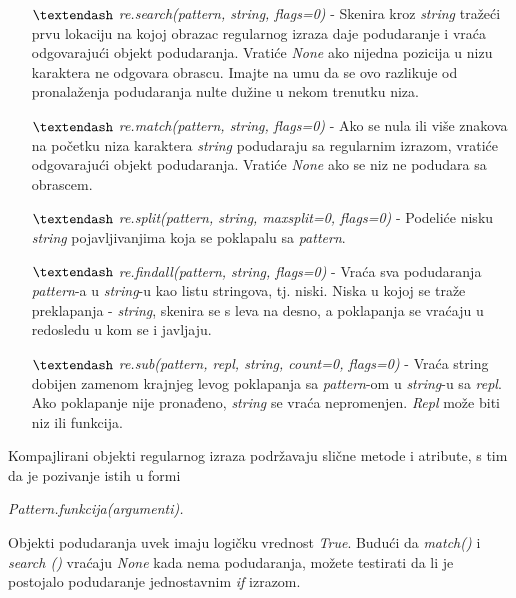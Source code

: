 \documentclass[12pt,oneside]{memoir}
\theoremstyle{plain}
\theoremstyle{definition}
\begin{document}
\begin{itemize}
\item[$\textendash$]  \textit{re.search(pattern, string, flags=0)} - Skenira kroz \textit{string} tražeći prvu lokaciju na kojoj obrazac regularnog izraza daje podudaranje i vraća odgovarajući objekt podudaranja. Vratiće \textit{None} ako nijedna pozicija u nizu karaktera ne odgovara obrascu. Imajte na umu da se ovo razlikuje od pronalaženja podudaranja nulte dužine u nekom trenutku niza.
\item[$\textendash$]  \textit{re.match(pattern, string, flags=0)} - Ako se nula ili više znakova na početku niza karaktera \textit{string}  podudaraju sa regularnim izrazom, vratiće odgovarajući objekt podudaranja. Vratiće \textit{None} ako se niz ne podudara sa obrascem.
\item[$\textendash$]  \textit{re.split(pattern, string, maxsplit=0, flags=0)} - Podeliće nisku \textit{string} pojavljivanjima koja se poklapalu sa \textit{pattern}. 
\item[$\textendash$]  \textit{re.findall(pattern, string, flags=0)} - Vraća sva podudaranja \textit{pattern}-a u \textit{string}-u kao listu stringova, tj. niski. Niska u kojoj se traže preklapanja - \textit{string}, skenira se s leva na desno, a poklapanja se vraćaju u redosledu u kom se i javljaju. 
\item[$\textendash$]  \textit{re.sub(pattern, repl, string, count=0, flags=0)} - Vraća string dobijen zamenom krajnjeg levog poklapanja sa \textit{pattern}-om u \textit{string}-u sa \textit{repl}. Ako poklapanje nije pronađeno, \textit{string} se vraća nepromenjen. \textit{Repl} može biti niz ili funkcija.
\end{itemize}

Kompajlirani objekti regularnog izraza podržavaju slične metode i atribute, s tim da je pozivanje istih u formi
\begin{center}
\textit{Pattern.funkcija(argumenti).}
\end{center}

Objekti podudaranja uvek imaju logičku vrednost \textit{True}. Budući da \textit{match()} i \textit{search ()} vraćaju \textit{None} kada nema podudaranja, možete testirati da li je postojalo podudaranje jednostavnim \textit{if} izrazom. 
\end{document}
